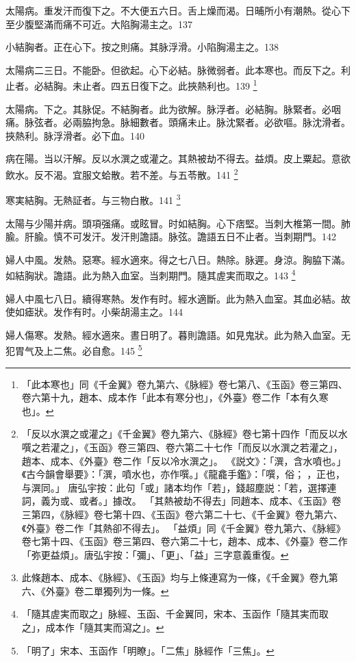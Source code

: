 太陽病。重发汗而復下之。不大便五六日。舌上燥而渴。日晡所小有潮熱。從心下至少腹堅滿而痛不可近。大陷胸湯主之。137

小結胸者。正在心下。按之則痛。其脉浮滑。小陷胸湯主之。138

太陽病二三日。不能卧。但欲起。心下必結。脉微弱者。此本寒也。而反下之。利止者。必結胸。未止者。四五日復下之。此挾熱利也。139
	\footnote{
		「此本寒也」同《千金翼》卷九第六、《脉經》卷七第八、《玉函》卷三第四、卷六第十九，趙本、成本作「此本有寒分也」，《外臺》卷二作「本有久寒也」。
	}

太陽病。下之。其脉促。不結胸者。此为欲解。脉浮者。必結胸。脉緊者。必咽痛。脉弦者。必兩脇拘急。脉細數者。頭痛未止。脉沈緊者。必欲嘔。脉沈滑者。挾熱利。脉浮滑者。必下血。140

病在陽。当以汗解。反以水潠之或灌之。其熱被劫不得去。益煩。皮上粟起。意欲飲水。反不渴。宜服文蛤散。若不差。与五苓散。141
	\footnote{
		「反以水潠之或灌之」《千金翼》卷九第六、《脉經》卷七第十四作「而反以水噀之若灌之」，《玉函》卷三第四、卷六第二十七作「而反以水潠之若灌之」，趙本、成本、《外臺》卷二作「反以冷水潠之」。
		《説文》：「潠，含水噴也。」《古今韻會舉要》：「潠，噴水也，亦作噀。」《龍龕手鑑》：「噀，俗；{\sungtpii 𠹀}，正也，与潠同。」
		唐弘宇按：此句「或」諸本均作「若」，錢超塵説：「若，選擇連詞，義为或、或者。」據改。
		「其熱被劫不得去」同趙本、成本、《玉函》卷三第四，《脉經》卷七第十四、《玉函》卷六第二十七、《千金翼》卷九第六、《外臺》卷二作「其熱卻不得去」。
		「益煩」同《千金翼》卷九第六、《脉經》卷七第十四、《玉函》卷三第四、卷六第二十七，趙本、成本、《外臺》卷二作「弥更益煩」。唐弘宇按：「彌」、「更」、「益」三字意義重復。
	}

寒実結胸。无熱証者。与三物白散。141
	\footnote{
		此條趙本、成本、《脉經》、《玉函》均与上條連寫为一條，《千金翼》卷九第六、《外臺》卷二單獨列为一條。
	}

太陽与少陽并病。頭項强痛。或眩冒。时如結胸。心下痞堅。当刺大椎第一間。肺腧。肝腧。慎不可发汗。发汗則譫語。脉弦。譫語五日不止者。当刺期門。142

婦人中風。发熱。惡寒。經水適來。得之七八日。熱除。脉遲。身涼。胸脇下滿。如結胸狀。譫語。此为熱入血室。当刺期門。隨其{\khaaitp 虗}実而取之。143
	\footnote{「隨其虗実而取之」脉經、玉函、千金翼同，宋本、玉函作「隨其実而取之」，成本作「隨其実而瀉之」。}

婦人中風七八日。續得寒熱。发作有时。經水適斷。此为熱入血室。其血必結。故使如瘧狀。发作有时。小柴胡湯主之。144

婦人傷寒。发熱。經水適來。晝日明了。暮則譫語。如見鬼狀。此为熱入血室。无犯胃气及上二焦。必自愈。145
	\footnote{「明了」宋本、玉函作「明瞭」。「二焦」脉經作「三焦」。}

